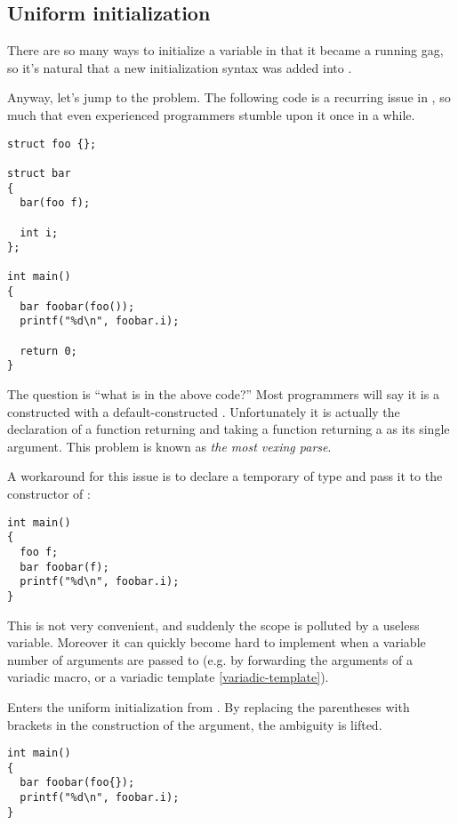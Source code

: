 \subsection{Uniform initialization}
\label{uniform-initialization}

\problemtitle

There are so many ways to initialize a variable in \cpp{} that it
became a running gag, so it's natural that a new initialization syntax
was added into .

Anyway, let's jump to the problem. The following code is a recurring
issue in \cpp{}, so much that even experienced programmers stumble
upon it once in a while.

\begin{lstlisting}
struct foo {};

struct bar
{
  bar(foo f);

  int i;
};

int main()
{
  bar foobar(foo());
  printf("%d\n", foobar.i);

  return 0;
}
\end{lstlisting}

The question is ``what is  in the above code?'' Most
\cpp{} programmers will say it is a  constructed with a
default-constructed . Unfortunately it is actually the
declaration of a function returning  and taking a function
returning a  as its single argument. This problem is known
as \emph{the most vexing parse}.

A workaround for this issue is to declare a temporary of type
 and pass it to the constructor of :

\begin{lstlisting}
int main()
{
  foo f;
  bar foobar(f);
  printf("%d\n", foobar.i);
}
\end{lstlisting}

This is not very convenient, and suddenly the scope is polluted by a
useless variable. Moreover it can quickly become hard to implement
when a variable number of arguments are passed to 
(e.g. by forwarding the arguments of a variadic macro, or a variadic
template \ref{variadic-template}).

\solutiontitle

Enters the uniform initialization from . By replacing the
parentheses with brackets in the construction of the argument, the
ambiguity is lifted.

\begin{lstlisting}
int main()
{
  bar foobar(foo{});
  printf("%d\n", foobar.i);
}
\end{lstlisting}

